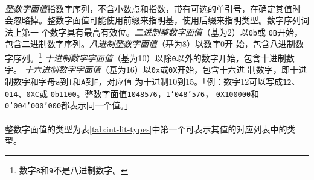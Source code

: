 \paragraph{}
\textit{整数字面值}指数字序列，不含小数点和指数，带有可选的单引号，在确定其值时
会忽略掉。整数字面值可能使用前缀来指明基，使用后缀来指明类型。数字序列词法上第一
个数字具有最高有效位。\textit{二进制整数字面值}（基为2）以\texttt{0b}或
\texttt{0B}开始，包含二进制数字序列。\textit{八进制整数字面值}（基为8）以数字0开
始，包含八进制数字序列。\footnote{数字\texttt{8}和\texttt{9}不是八进制数字。}
\textit{十进制数字字面值}（基为10）以除\texttt{0}以外的数字开始，包含十进制数字。
\textit{十六进制数字字面值}（基为16）以\texttt{0x}或\texttt{0X}开始，包含十六进
制数字，即十进制数字和字母\texttt{a}到\texttt{f}和\texttt{A}到\texttt{F}，对应值
为十进制10到15。「例：数字12可以写成\texttt{12}、\texttt{014}、\texttt{0XC}或
\texttt{0b1100}。整数字面值\texttt{1048576}，\texttt{1'048'576}，
\texttt{0X100000}和\texttt{0'004'000'000}都表示同一个值。」

\paragraph{}
整数字面值的类型为表\ref{tab:int-lit-types}中第一个可表示其值的对应列表中的类型。

